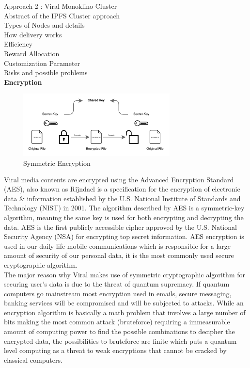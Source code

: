 \documentclass[conference]{IEEEtran}
\begin{document}
Approach 2 : Viral Monoklino Cluster\\

Abstract of the IPFS Cluster approach\\
Types of Nodes and details\\
How delivery works\\
Efficiency\\
Reward Allocation\\
Customization Parameter\\
Risks and possible problems\\

\textbf{Encryption}\\

\begin{figure}[H]
\begin{center}
\includegraphics[width=8cm]{aes}
\caption{Symmetric Encryption}
\end{center}
\end{figure}

Viral media contents are encrypted using the Advanced Encryption Standard (AES), also known as Rijndael is a specification for the encryption of electronic data \& information established by the U.S. National Institute of Standards and Technology (NIST) in 2001. The algorithm described by AES is a symmetric-key algorithm, meaning the same key is used for both encrypting and decrypting the data. AES is the first publicly accessible cipher approved by the U.S. National Security Agency (NSA) for encrypting top secret information. AES encryption is used in our daily life mobile communications which is responsible for a large amount of security of our personal data, it is the most commonly used secure cryptographic algorithm.\\

The major reason why Viral makes use of symmetric cryptographic algorithm for securing user's data is due to the threat of quantum supremacy. If quantum computers go mainstream most encryption used in emails, secure messaging, banking services will be compromised and will be subjected to attacks. While an encryption algorithm is basically a math problem that involves a large number of bits making the most common attack (bruteforce) requiring a immeasurable amount of computing power to find the possible combinations to decipher the encrypted data, the possibilities to bruteforce are finite which puts a quantum level computing as a threat to weak encryptions that cannot be cracked by classical computers.\\
\end{document}

